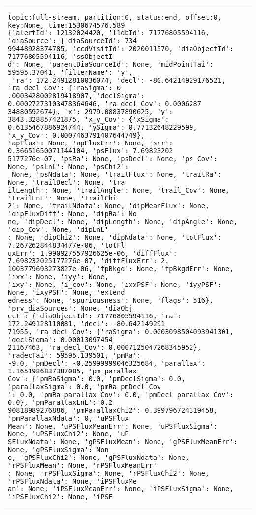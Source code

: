 \documentclass[DM,lsstdraft,STR,toc]{lsstdoc}
\begin{document}
\begin{longtable}{p{2cm}p{14cm}}
\scriptsize{
\begin{verbatim}
topic:full-stream, partition:0, status:end, offset:0, key:None, time:1530674576.589
{'alertId': 12132024420, 'l1dbId': 71776805594116, 'diaSource': {'diaSourceId': 734
99448928374785, 'ccdVisitId': 2020011570, 'diaObjectId': 71776805594116, 'ssObjectI
d': None, 'parentDiaSourceId': None, 'midPointTai': 59595.37041, 'filterName': 'y',
 'ra': 172.24912810036074, 'decl': -80.64214929176521, 'ra_decl_Cov': {'raSigma': 0
.0003428002819418907, 'declSigma': 0.00027273103478364646, 'ra_decl_Cov': 0.0006287
34880592674}, 'x': 2979.08837890625, 'y': 3843.328857421875, 'x_y_Cov': {'xSigma': 
0.6135467886924744, 'ySigma': 0.77132648229599, 'x_y_Cov': 0.0007463791407644749}, 
'apFlux': None, 'apFluxErr': None, 'snr': 0.36651650071144104, 'psFlux': 7.69823202
5177276e-07, 'psRa': None, 'psDecl': None, 'ps_Cov': None, 'psLnL': None, 'psChi2':
 None, 'psNdata': None, 'trailFlux': None, 'trailRa': None, 'trailDecl': None, 'tra
ilLength': None, 'trailAngle': None, 'trail_Cov': None, 'trailLnL': None, 'trailChi
2': None, 'trailNdata': None, 'dipMeanFlux': None, 'dipFluxDiff': None, 'dipRa': No
ne, 'dipDecl': None, 'dipLength': None, 'dipAngle': None, 'dip_Cov': None, 'dipLnL'
: None, 'dipChi2': None, 'dipNdata': None, 'totFlux': 7.267262844834477e-06, 'totFl
uxErr': 1.990927557926625e-06, 'diffFlux': 7.698232025177276e-07, 'diffFluxErr': 2.
1003779693273827e-06, 'fpBkgd': None, 'fpBkgdErr': None, 'ixx': None, 'iyy': None, 
'ixy': None, 'i_cov': None, 'ixxPSF': None, 'iyyPSF': None, 'ixyPSF': None, 'extend
edness': None, 'spuriousness': None, 'flags': 516}, 'prv_diaSources': None, 'diaObj
ect': {'diaObjectId': 71776805594116, 'ra': 172.249128110081, 'decl': -80.642149291
71955, 'ra_decl_Cov': {'raSigma': 0.0003098504093941301, 'declSigma': 0.00013097454
21167463, 'ra_decl_Cov': 0.0007125047268345952}, 'radecTai': 59595.139501, 'pmRa': 
-9.0, 'pmDecl': -0.25999999046325684, 'parallax': 1.1651986837387085, 'pm_parallax_
Cov': {'pmRaSigma': 0.0, 'pmDeclSigma': 0.0, 'parallaxSigma': 0.0, 'pmRa_pmDecl_Cov
': 0.0, 'pmRa_parallax_Cov': 0.0, 'pmDecl_parallax_Cov': 0.0}, 'pmParallaxLnL': 0.2
90818989276886, 'pmParallaxChi2': 0.399796724319458, 'pmParallaxNdata': 0, 'uPSFlux
Mean': None, 'uPSFluxMeanErr': None, 'uPSFluxSigma': None, 'uPSFluxChi2': None, 'uP
SFluxNdata': None, 'gPSFluxMean': None, 'gPSFluxMeanErr': None, 'gPSFluxSigma': Non
e, 'gPSFluxChi2': None, 'gPSFluxNdata': None, 'rPSFluxMean': None, 'rPSFluxMeanErr'
: None, 'rPSFluxSigma': None, 'rPSFluxChi2': None, 'rPSFluxNdata': None, 'iPSFluxMe
an': None, 'iPSFluxMeanErr': None, 'iPSFluxSigma': None, 'iPSFluxChi2': None, 'iPSF

\end{verbatim}}
\end{longtable}
\end{document}
